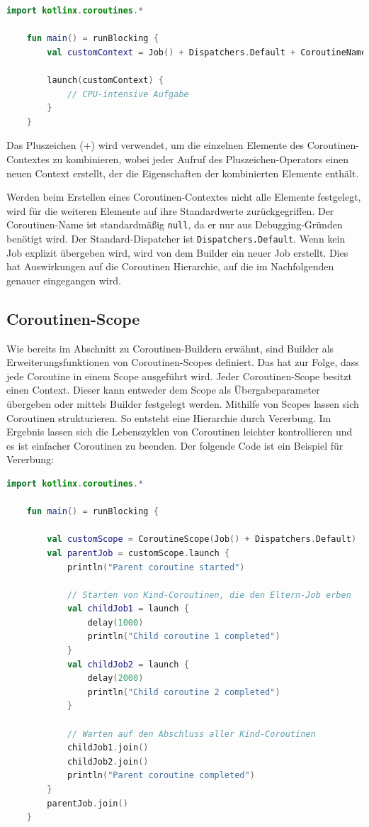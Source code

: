 \documentclass[fontsize=12pt,paper=a4,twoside=semi,parskip=half-,headsepline,headinclude]{scrreprt}
\begin{document}
\begin{lstlisting}[language=Kotlin]
	import kotlinx.coroutines.*

	fun main() = runBlocking {
		val customContext = Job() + Dispatchers.Default + CoroutineName("MyCoroutine")
	
		launch(customContext) {
			// CPU-intensive Aufgabe
		}
	}
\end{lstlisting}

Das Pluszeichen (+) \cite{Operator2024} wird verwendet, um die einzelnen Elemente des Coroutinen-Contextes zu kombinieren, wobei jeder Aufruf des Pluszeichen-Operators einen neuen Context erstellt, der die Eigenschaften der kombinierten Elemente enthält.

Werden beim Erstellen eines Coroutinen-Contextes nicht alle Elemente festgelegt, wird für die weiteren Elemente auf ihre Standardwerte zurückgegriffen. Der Coroutinen-Name ist standardmäßig \texttt{null}, da er nur aus Debugging-Gründen benötigt wird. Der Standard-Dispatcher ist \texttt{Dispatchers.Default}. Wenn kein Job explizit übergeben wird, wird von dem Builder ein neuer Job erstellt. Dies hat Auswirkungen auf die Coroutinen Hierarchie, auf die im Nachfolgenden genauer eingegangen wird.

\subsection{Coroutinen-Scope}
\label{subsec:coroutinescope}

Wie bereits im Abschnitt zu Coroutinen-Buildern erwähnt, sind Builder als  Erweiterungsfunktionen von Coroutinen-Scopes definiert. Das hat zur Folge, dass jede Coroutine in einem Scope ausgeführt wird. Jeder Coroutinen-Scope besitzt einen Context. Dieser kann entweder dem Scope als Übergabeparameter übergeben oder mittels Builder festgelegt werden. Mithilfe von Scopes lassen sich Coroutinen strukturieren. So entsteht eine Hierarchie durch Vererbung. Im Ergebnis lassen sich die Lebenszyklen von Coroutinen leichter kontrollieren und es ist einfacher Coroutinen zu beenden. Der folgende Code ist ein Beispiel für Vererbung:

\begin{lstlisting}[language=Kotlin]
	import kotlinx.coroutines.*

	fun main() = runBlocking {
	
    	val customScope = CoroutineScope(Job() + Dispatchers.Default)
		val parentJob = customScope.launch {
			println("Parent coroutine started")
			
			// Starten von Kind-Coroutinen, die den Eltern-Job erben
			val childJob1 = launch {
				delay(1000)
				println("Child coroutine 1 completed")
			}
			val childJob2 = launch {
				delay(2000)
				println("Child coroutine 2 completed")
			}
			
			// Warten auf den Abschluss aller Kind-Coroutinen
			childJob1.join()
			childJob2.join()
			println("Parent coroutine completed")
		}
		parentJob.join()
	}
\end{lstlisting}
\end{document}
